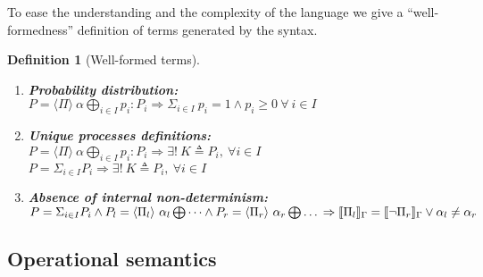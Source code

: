 \documentclass{article}
\newtheorem{defn}{Definition}
\theoremstyle{remark}
\begin{document}
To ease the understanding and the complexity of the language we give a ``well-formedness'' definition of terms generated by the syntax. 
\begin{defn}[Well-formed terms]\label{def:wellformedness}
\begin{enumerate} A term generated by syntax in Table~\ref{tab:syntax} is \emph{well-formed} if all the following conditions hold:
	\item \textbf{Probability distribution:} \\ 
	$P = \langle \Pi \rangle\ \alpha \bigoplus_{i \in I} p_i : P_i \Rightarrow \Sigma_{i \in I}\ p_i = 1 \wedge p_i \geq 0\ \forall\ i \in I$
	\item \textbf{Unique processes definitions:} \\
	$ P = \langle \Pi \rangle\ \alpha \bigoplus_{i \in I} p_i : P_i \Rightarrow \exists !\ K \triangleq P_i,\ \forall i \in I$ \\
	$ P = \Sigma_{i \in I} P_i \Rightarrow \exists !\ K \triangleq P_i,\ \forall i \in I$
	\item \textbf{Absence of internal non-determinism:} \\
	$ P = \Sigma_{i \in I} P_i \wedge P_l = \langle \Pi_l \rangle\ \alpha_l \bigoplus \dots \wedge P_r = \langle \Pi_r \rangle\ \alpha_r \bigoplus \dots \\ \Rightarrow \llbracket \Pi_l \rrbracket_\Gamma = \llbracket \neg \Pi_r \rrbracket_\Gamma \vee \alpha_l \neq \alpha_r $ 
\end{enumerate}
\end{defn}

\subsection*{Operational semantics} %
\label{sec:semantics}
\end{document}
